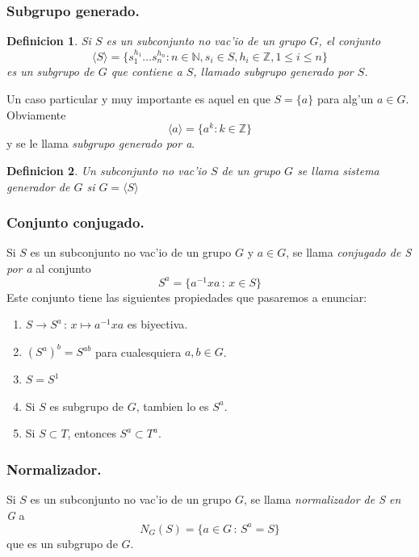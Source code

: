 \documentclass[a4paper,openright,12pt]{book}
\numberwithin{equation}{section} %
\newtheorem{definicion}{Definicion}[section] %
\begin{document}
\subsubsection{Subgrupo generado.}
\begin{definicion}
Si $S$ es un subconjunto no vac'io de un grupo $G$, el conjunto
\[
\langle S \rangle = \{s_{1}^{h_{1}}\ldots s_{n}^{h_{n}}:n\in \mathbb{N},s_{i}\in S,h_{i}\in \mathbb{Z}, 1 \le i \le n \}
\]
es un subgrupo de $G$ que contiene a $S$, llamado subgrupo generado por $S$.
\end{definicion}
Un caso particular y muy importante es aquel en que $S=\{a\}$ para alg'un $a \in G$. Obviamente
\[
\langle a \rangle = \{a^{k}:k \in \mathbb{Z} \}
\]
y se le llama \textit{subgrupo generado por a}.
\begin{definicion}
Un subconjunto no vac'io $S$ de un grupo $G$ se llama sistema generador de $G$ si $G=\langle S \rangle$
\end{definicion}
\subsubsection{Conjunto conjugado.}
Si $S$ es un subconjunto no vac'io de un grupo $G$ y $a \in G$, se llama \textit{conjugado de S por a} al conjunto
\[
S^{a}=\{a^{-1}xa\,:\,x\in S  \}
\]
Este conjunto tiene las siguientes propiedades que pasaremos a enunciar:
\begin{enumerate}
\item $S \rightarrow S^{a} \,:\, x\mapsto a^{-1}xa$ es biyectiva.
\item $(S^{a})^{b}=S^{ab}$ para cualesquiera $a,b \in G$.
\item $S=S^{1}$
\item Si $S$ es subgrupo de $G$, tambien lo es $S^{a}$.
\item Si $S \subset T$, entonces $S^{a} \subset T^{a}$.
\end{enumerate}
\subsubsection{Normalizador.}
Si $S$ es un subconjunto no vac'io de un grupo $G$, se llama \textit{normalizador de S en G} a 
\[
N_{G}(S) = \{a \in G \,:\, S^{a}=S \}
\]
que es un subgrupo de $G$.
\end{document}
